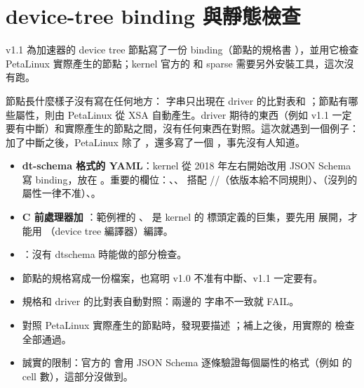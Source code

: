 \section{device-tree binding 與靜態檢查}
\label{sec:binding}

\begin{oneline}
v1.1 為加速器的 device tree 節點寫了一份 binding（節點的規格書 ），並用它檢查 PetaLinux 實際產生的節點；kernel 官方的  和 sparse 需要另外安裝工具，這次沒有跑。
\end{oneline}

\begin{before}
節點長什麼樣子沒有寫在任何地方： 字串只出現在 driver 的比對表和 ；節點有哪些屬性，則由 PetaLinux 從 XSA 自動產生。driver 期待的東西（例如 v1.1 一定要有中斷）和實際產生的節點之間，沒有任何東西在對照。這次就遇到一個例子：加了中斷之後，PetaLinux 除了 ，還多寫了一個 ，事先沒有人知道。
\end{before}

\begin{tech}
\begin{itemize}
\item \textbf{dt-schema 格式的 YAML}：kernel 從 2018 年左右開始改用 JSON Schema 寫 binding，放在 。重要的欄位：、、 搭配 //（依版本給不同規則）、（沒列的屬性一律不准）、。
\item \textbf{C 前處理器加 }：範例裡的 、 是 kernel 的  標頭定義的巨集，要先用  展開，才能用 （device tree 編譯器）編譯。
\item \textbf{}：沒有 dtschema 時能做的部分檢查。
\end{itemize}
\end{tech}

\begin{gain}
\begin{itemize}
\item 節點的規格寫成一份檔案，也寫明 v1.0 不准有中斷、v1.1 一定要有。
\item 規格和 driver 的比對表自動對照：兩邊的  字串不一致就 FAIL。
\item 對照 PetaLinux 實際產生的節點時，發現要描述 ；補上之後，用實際的  檢查全部通過。
\item 誠實的限制：官方的  會用 JSON Schema 逐條驗證每個屬性的格式（例如  的 cell 數），這部分沒做到。
\end{itemize}
\end{gain}

